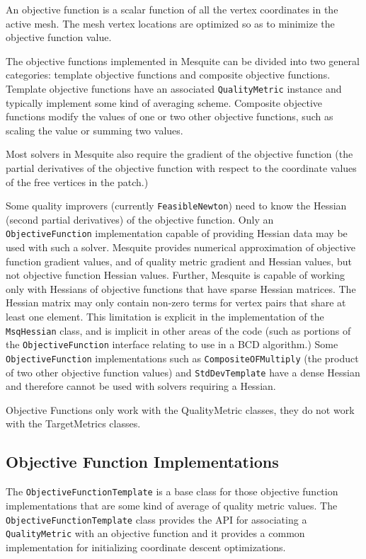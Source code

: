 An objective function is a scalar function of all the vertex coordinates in the active mesh.  The mesh vertex locations are optimized so as to minimize the objective function value.  

The objective functions implemented in Mesquite can be divided into two general categories: template objective functions and composite objective functions.  Template objective functions have an associated \texttt{QualityMetric} instance and typically implement some kind of averaging scheme.  Composite objective functions modify the values of one or two other objective functions, such as scaling the value or summing two values.

Most solvers in Mesquite also require the gradient of the objective function (the partial derivatives of the objective function with respect to the coordinate values of the free vertices in the patch.)  

\label{sec:Hessian} Some quality improvers (currently \texttt{FeasibleNewton}) need to know the Hessian (second partial derivatives) of the objective function.  Only an \texttt{ObjectiveFunction} implementation capable of providing Hessian data may be used with such a solver.  Mesquite provides numerical approximation of objective function gradient values, and of quality metric gradient and Hessian values, but not objective function Hessian values.  Further, Mesquite is capable of working only with Hessians of objective functions that have sparse Hessian matrices.  The Hessian matrix may only contain non-zero terms for vertex pairs that share at least one element.  This limitation is explicit in the implementation of the \texttt{MsqHessian} class, and is implicit in other areas of the code (such as portions of the \texttt{ObjectiveFunction} interface relating to use in a BCD algorithm.)  Some \texttt{ObjectiveFunction} implementations such as \texttt{CompositeOFMultiply} (the product of two other objective function values) and \texttt{StdDevTemplate} have a dense Hessian and therefore cannot be used with solvers requiring a Hessian.

Objective Functions only work with the QualityMetric classes, they do not work with the TargetMetrics classes.

\subsection{Objective Function Implementations}
\label{sec:objfunc_impl}

The \texttt{ObjectiveFunctionTemplate} is a base class for those objective function implementations that are some kind of average of quality metric values.  The \texttt{ObjectiveFunctionTemplate} class provides the API for associating a \texttt{QualityMetric} with an objective function and it provides a common implementation for initializing coordinate descent optimizations.

